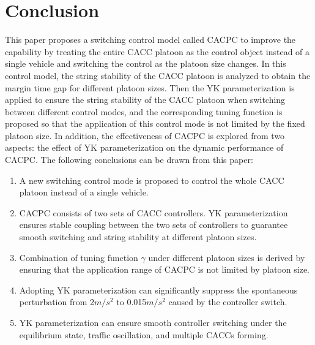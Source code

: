 \documentclass[trsc,nonblindrev]{informs3} %
\begin{document}
\section{Conclusion}
\label{Section 6}

This paper proposes a switching control model called CACPC to improve the capability by treating the entire CACC platoon as the control object instead of a single vehicle and switching the control as the platoon size changes. In this control model, the string stability of the CACC platoon is analyzed to obtain the margin time gap for different platoon sizes. Then the YK parameterization is applied to ensure the string stability of the CACC platoon when switching between different control modes, and the corresponding tuning function is proposed so that the application of this control mode is not limited by the fixed platoon size. In addition, the effectiveness of CACPC is explored from two aspects: the effect of YK parameterization on the dynamic performance of CACPC. The following conclusions can be drawn from this paper:
\begin{enumerate}
    \item A new switching control mode is proposed to control the whole CACC platoon instead of a single vehicle.
    \item CACPC consists of two sets of CACC controllers. YK parameterization ensures stable coupling between the two sets of controllers to guarantee smooth switching and string stability at different platoon sizes.
    \item Combination of tuning function $\gamma$ under different platoon sizes is derived by ensuring that the application range of CACPC is not limited by platoon size.
    \item Adopting YK parameterization can significantly suppress the spontaneous perturbation from 2$m/s^2$ to 0.015$m/s^2$ caused by the controller switch.
    \item YK parameterization can ensure smooth controller switching under the equilibrium state, traffic oscillation, and multiple CACCs forming.
\end{enumerate}
\end{document}
